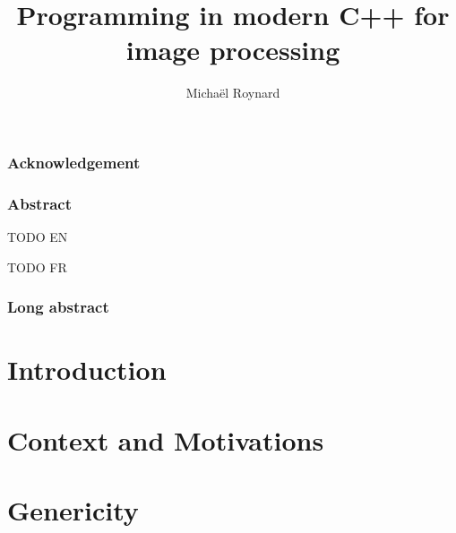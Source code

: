 \documentclass[11pt]{book}
\begin{document}
%
\title{Programming in modern C++ for image processing}


\author{Michaël Roynard}



\maketitle

\section{Acknowledgement}
\label{sec.acknowledgement}


\section{Abstract}
\label{sec.abstract}
TODO EN

TODO FR

\section{Long abstract}
\label{sec.long_abstract}


\tableofcontents
\label{table.of.contents}

\listoffigures
\label{list.of.figures}

\listoftables
\label{list.of.tables}

\cleardoublepage


\part{Introduction}
\label{part.introduction}



\cleardoublepage


\part{Context and Motivations}
\label{part.context_and_motivations}



\cleardoublepage


\part{Genericity}
\label{part.genericity}
\end{document}

